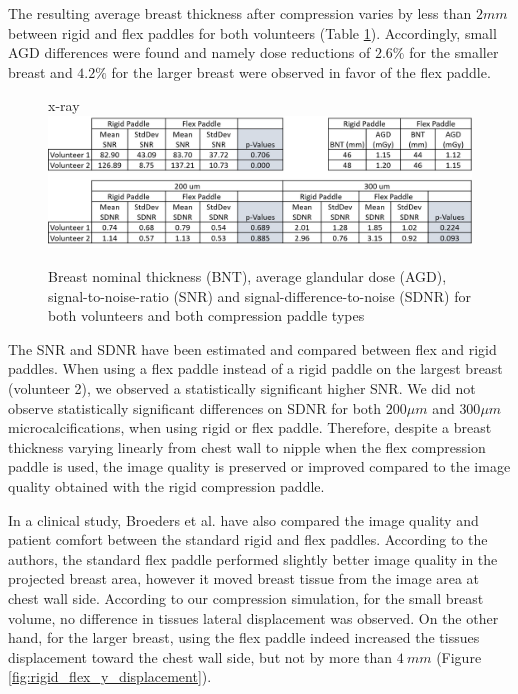 The resulting average breast thickness after compression varies by less than $2mm$ between rigid and flex paddles for both volunteers (Table \ref{fig:table_compression_results}). Accordingly, small AGD differences were found and namely dose reductions of $2.6 \%$ for the smaller breast and $4.2\%$ for the larger breast were observed in favor of the flex paddle.

\begin{figure}[!h]x-ray
\centering
\includegraphics[width=\textwidth,keepaspectratio]{figures/table_compression_results.png} 
\caption{Breast nominal thickness (BNT), average glandular dose (AGD), signal-to-noise-ratio (SNR) and signal-difference-to-noise (SDNR) for both volunteers and both compression paddle types}\label{fig:table_compression_results}
\end{figure}

The SNR and SDNR have been estimated and compared between flex and rigid paddles. When using a flex paddle instead of a rigid paddle on the largest breast (volunteer 2), we observed a statistically significant higher SNR. We did not observe statistically significant differences on SDNR for both $200\mu m$ and $300\mu m$ microcalcifications, when using rigid or flex paddle. Therefore, despite a breast thickness varying linearly from chest wall to nipple when the flex compression paddle is used, the image quality is preserved or improved compared to the image quality obtained with the rigid compression paddle.

In a clinical study, Broeders et al. \citep{broeders_comparison_2015} have also compared the image quality and patient comfort between the standard rigid and flex paddles. According to the authors, the standard flex paddle performed slightly better image quality in the projected breast area, however it moved breast tissue from the image area at chest wall side. According to our compression simulation, for the small breast volume, no difference in tissues lateral displacement was observed. On the other hand, for the larger breast, using the flex paddle indeed increased the tissues displacement toward the chest wall side, but not by more than $4 \ mm$ (Figure \ref{fig:rigid_flex_y_displacement}).  

